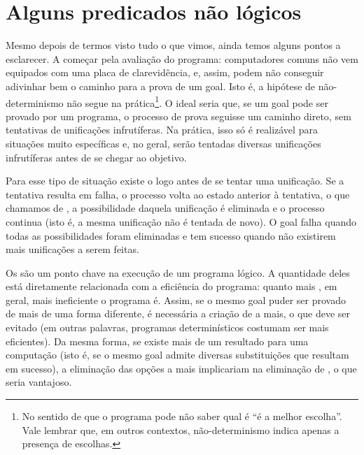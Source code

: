 


%
%
%



\section{Alguns predicados não lógicos}

Mesmo depois de termos visto tudo o que vimos, ainda temos alguns pontos a esclarecer. A começar pela avaliação do programa: computadores comuns não vem equipados com uma placa de clarevidência, e, assim, podem não conseguir adivinhar bem o caminho para a prova de um goal. Isto é, a hipótese de não-determinismo não segue na prática\footnote{No sentido de que o programa pode não saber qual é ``é a melhor escolha''. Vale lembrar que, em outros contextos, não-determinismo indica apenas a
  presença de escolhas. }. O ideal seria que, se um goal pode ser provado por um programa, o processo de prova seguisse um caminho direto, sem tentativas de unificações infrutíferas. Na prática, isso só é realizável para situações muito específicas e, no geral, serão tentadas
diversas unificações infrutíferas antes de se chegar ao objetivo.

Para esse tipo de situação existe o  logo antes de se tentar uma unificação. Se a tentativa resulta em falha, o processo volta ao estado anterior à tentativa, o que chamamos de , a possibilidade daquela unificação é eliminada e o processo continua (isto é, a mesma unificação não é tentada de novo). O goal falha quando todas as possibilidades foram eliminadas e tem sucesso quando não existirem mais unificações a serem feitas.

Os  são um ponto chave na execução de um programa lógico. A quantidade deles está diretamente relacionada com a eficiência do programa: quanto mais , em geral, mais ineficiente o programa é. Assim, se o mesmo goal puder ser provado de mais de uma forma diferente, é necessária a criação de  a mais, o que deve ser evitado (em outras palavras, programas determinísticos costumam ser mais eficientes). Da mesma forma, se existe mais
de um resultado para uma computação (isto é, se o mesmo goal admite diversas substituições que resultam em sucesso), a eliminação das opções a mais implicariam na eliminação de , o que seria vantajoso.

